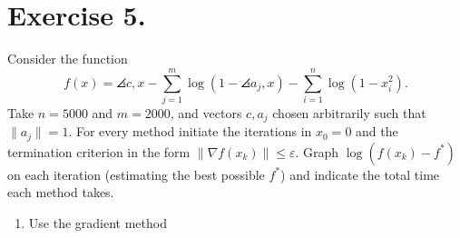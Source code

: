\section*{Exercise 5.}

Consider the function
\[ f(x) = \angles{c,x} - \sum_{j = 1}^m \log(1-\angles{a_j,x}) - \sum_{i = 1}^n \log(1-x_i^2). \]
Take $n = 5000$ and $m = 2000$, and vectors $c,a_j$ chosen arbitrarily such that $\|a_j\| = 1$. For every method initiate the iterations in $x_0 = 0$ and the termination criterion in the form $\|\nabla f(x_k)\| \leq \varepsilon$. Graph $\log(f(x_k)-f^*)$ on each iteration (estimating the best possible $f^*$) and indicate the total time each method takes.

\begin{enumerate}[label=\alph*)]
    \item Use the gradient method
\end{enumerate}